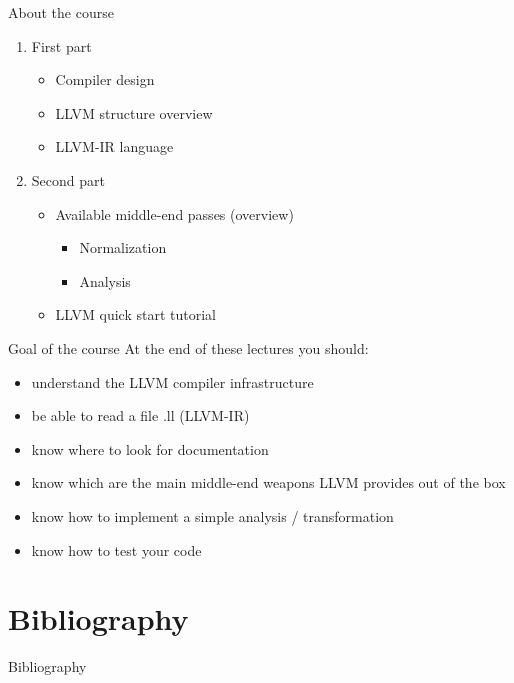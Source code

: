 \documentclass[10pt,mathserif]{beamer}
\begin{document}
\begin{frame}[t]{About the course}
  \begin{Large}
  \vfill
  \begin{enumerate}
    \item First part
      \begin{itemize}
        \vfill
        \item Compiler design
        \vfill
        \item LLVM structure overview
        \vfill
        \item LLVM-IR language
    \end{itemize}
    \vfill
    \item Second part
      \begin{itemize}
        \item Available middle-end passes (overview)
        \vfill
        \begin{itemize}
          \item Normalization
        \vfill
          \item Analysis
        \end{itemize}
        \vfill
        \item LLVM quick start tutorial
      \end{itemize}
  \end{enumerate}
  \vfill
\end{Large}
\end{frame}

\begin{frame}[t]{Goal of the course}
  At the end of these lectures you should:
  \begin{itemize}
    \vfill
    \item understand the LLVM compiler infrastructure
    \vfill
    \item be able to read a file .ll (LLVM-IR)
    \vfill
    \item know where to look for documentation
    \vfill
    \item know which are the main middle-end weapons
          LLVM provides out of the box
    \vfill
    \item know how to implement a simple analysis / transformation
    \vfill
    \item know how to test your code
  \end{itemize}
\end{frame}

\section*{Bibliography}
\begin{frame}[allowframebreaks]{Bibliography}
\nocite{*}


\end{frame}
\end{document}
